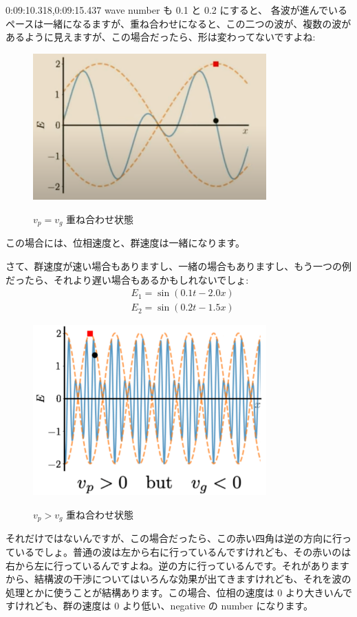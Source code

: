 0:09:10.318,0:09:15.437
wave number も 0.1 と 0.2 にすると、
\fi
各波が進んでいるペースは一緒になるますが、重ね合わせになると、この二つの波が、複数の波があるように見えますが、この場合だったら、形は変わってないですよね:
\begin{figure}[H]
   \centering
    \includegraphics[width=0.8\textwidth]{lesson6/vp_equal_vg.pdf}
    \label{fig: 1}
    \begin{center}
        \caption{$v_p = v_g$ 重ね合わせ状態}
    \end{center}
\end{figure}
この場合には、位相速度と、群速度は一緒になります。

さて、群速度が速い場合もありますし、一緒の場合もありますし、もう一つの例だったら、それより遅い場合もあるかもしれないでしょ:
\begin{equation}
\begin{aligned}
&E_{1}=\sin (0.1 t-2.0 x) \\
&E_{2}=\sin (0.2 t-1.5 x)
\end{aligned}
\end{equation}
\begin{figure}[H]
   \centering
    \includegraphics[width=0.8\textwidth]{lesson6/vp_greater_vg.pdf}
    \label{fig: 1}
    \begin{center}
        \caption{$v_p > v_g$ 重ね合わせ状態}
    \end{center}
\end{figure}
それだけではないんですが、この場合だったら、この赤い四角は逆の方向に行っているでしょ。普通の波は左から右に行っているんですけれども、その赤いのは右から左に行っているんですよね。逆の方に行っているんです。それがありますから、結構波の干渉についてはいろんな効果が出てきますけれども、それを波の処理とかに使うことが結構あります。この場合、位相の速度は 0 より大きいんですけれども、群の速度は 0 より低い、negative の number になります。

